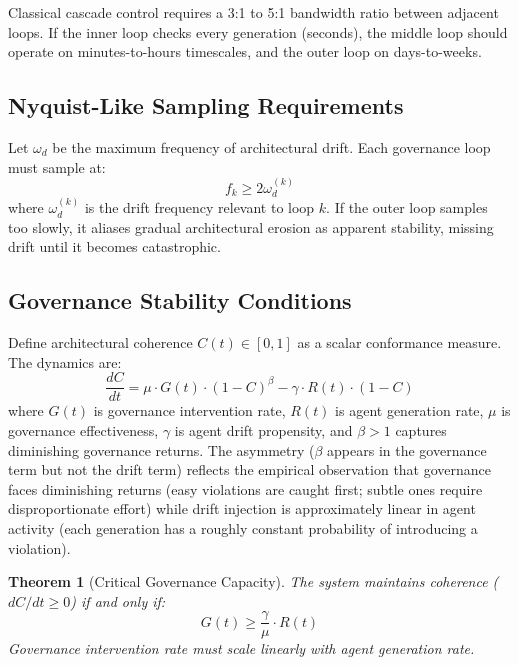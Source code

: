 \documentclass[11pt, a4paper, copyright]{googledeepmind}
\newtheorem{theorem}{Theorem}[section]
\begin{document}
Classical cascade control requires a 3:1 to 5:1 bandwidth ratio between adjacent loops. If the inner loop checks every generation (seconds), the middle loop should operate on minutes-to-hours timescales, and the outer loop on days-to-weeks.

\subsection{Nyquist-Like Sampling Requirements}

Let $\omega_d$ be the maximum frequency of architectural drift. Each governance loop must sample at:
\begin{equation}
    f_k \geq 2\omega_d^{(k)}
\end{equation}
where $\omega_d^{(k)}$ is the drift frequency relevant to loop $k$. If the outer loop samples too slowly, it aliases gradual architectural erosion as apparent stability, missing drift until it becomes catastrophic.

\subsection{Governance Stability Conditions}

Define architectural coherence $C(t) \in [0,1]$ as a scalar conformance measure. The dynamics are:
\begin{equation}
    \frac{dC}{dt} = \mu \cdot G(t) \cdot (1 - C)^\beta - \gamma \cdot R(t) \cdot (1 - C)
\end{equation}
where $G(t)$ is governance intervention rate, $R(t)$ is agent generation rate, $\mu$ is governance effectiveness, $\gamma$ is agent drift propensity, and $\beta > 1$ captures diminishing governance returns. The asymmetry ($\beta$ appears in the governance term but not the drift term) reflects the empirical observation that governance faces diminishing returns (easy violations are caught first; subtle ones require disproportionate effort) while drift injection is approximately linear in agent activity (each generation has a roughly constant probability of introducing a violation).

\begin{theorem}[Critical Governance Capacity]
\label{thm:critical}
The system maintains coherence ($dC/dt \geq 0$) if and only if:
\begin{equation}
    G(t) \geq \frac{\gamma}{\mu} \cdot R(t)
\end{equation}
Governance intervention rate must scale linearly with agent generation rate.
\end{theorem}
\end{document}

